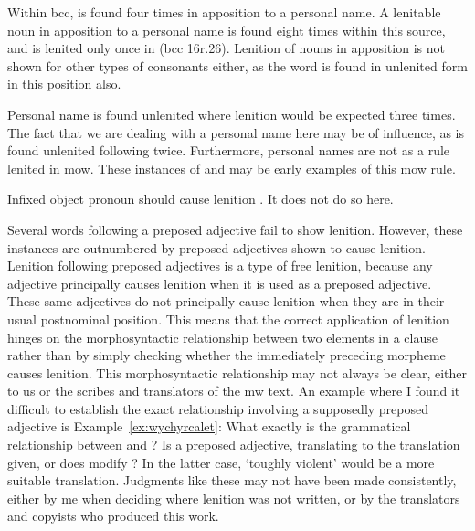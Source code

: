 Within \gls{bcc},  is found four times in apposition to a personal name.
A lenitable noun in apposition to a personal name is found eight times within this source, and is lenited only once in  (\gls{bcc} 16r.26).
Lenition of nouns in apposition is not shown for other types of consonants either, as the word  is found in unlenited form in this position also.

Personal name  is found unlenited where lenition would be expected three times. The fact that we are dealing with a personal name here may be of influence, as  is found unlenited following  twice. Furthermore, personal names are not as a rule lenited in \gls{mow}. These instances of  and  may be early examples of this \gls{mow} rule. 

Infixed object pronoun  should cause lenition . It does not do so here.

Several words following a preposed adjective fail to show lenition.
However, these instances are outnumbered by preposed adjectives shown to cause lenition.
Lenition following preposed adjectives is a type of free lenition, because any adjective principally causes lenition when it is used as a preposed adjective.
These same adjectives do not principally cause lenition when they are in their usual postnominal position.
This means that the correct application of lenition hinges on the morphosyntactic relationship between two elements in a clause rather than by simply checking whether the immediately preceding morpheme causes lenition.
This morphosyntactic relationship may not always be clear, either to us or the scribes and translators of the \gls{mw} text.
An example where I found it difficult to establish the exact relationship involving a supposedly preposed adjective is Example~\ref{ex:wychyrcalet}:
What exactly is the grammatical relationship between  and ?
Is  a preposed adjective, translating to the translation given, or does  modify ?
In the latter case, `toughly violent' would be a more suitable translation. 
Judgments like these may not have been made consistently, either by me when deciding where lenition was not written, or by the translators and copyists who produced this work.

